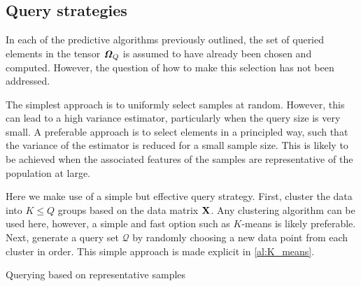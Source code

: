 \subsection{Query strategies}

\label{sec:query_strats}

In each of the predictive algorithms previously outlined, the set of queried elements in the tensor $\bm{\mathit{\Omega}}_Q$ is assumed to have already been chosen and computed. However, the question of how to make this selection has not been addressed. 

The simplest approach is to uniformly select samples at random. However, this can lead to a high variance estimator, particularly when the query size is very small. A preferable approach is to select elements in a principled way, such that the variance of the estimator is reduced for a small sample size. This is likely to be achieved when the associated features of the samples are representative of the population at large. 

Here we make use of a simple but effective query strategy. First, cluster the data into $K \leq Q$ groups based on the data matrix $\mathbf{X}$. Any clustering algorithm can be used here, however, a simple and fast option such as $K$-means is likely preferable. Next, generate a query set $\mathcal{Q}$ by randomly choosing a new data point from each cluster in order. This simple approach is made explicit in \cref{al:K_means}. 

\begin{algorithm}
\begin{algorithmic}
\vspace{0.05cm}
\vspace{0.05cm}
\vspace{0.05cm}
\vspace{0.15cm}
\vspace{0.15cm}
\vspace{0.15cm}
\vspace{0.15cm}
\vspace{0.15cm}
\vspace{0.15cm}
\vspace{0.15cm}
\vspace{0.15cm}
\EndFor
\vspace{0.15cm}
\vspace{0.15cm}
\end{algorithmic}
\caption{Querying based on representative samples}
\label{al:K_means}
\end{algorithm}


